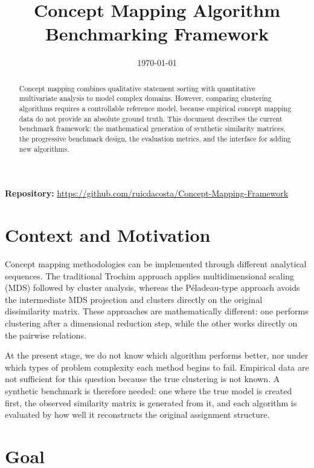 \documentclass[11pt,a4paper]{article}
\title{\textbf{Concept Mapping Algorithm Benchmarking Framework}}
\author{}
\date{\today}
\begin{document}
\maketitle

\begin{abstract}
Concept mapping combines qualitative statement sorting with quantitative multivariate analysis to model complex domains. However, comparing clustering algorithms requires a controllable reference model, because empirical concept mapping data do not provide an absolute ground truth. This document describes the current benchmark framework: the mathematical generation of synthetic similarity matrices, the progressive benchmark design, the evaluation metrics, and the interface for adding new algorithms.
\end{abstract}

\noindent\textbf{Repository:} \url{https://github.com/ruicdacosta/Concept-Mapping-Framework}

\vspace{0.5em}

\tableofcontents
\newpage

\section{Context and Motivation}

Concept mapping methodologies can be implemented through different analytical sequences. The traditional Trochim approach applies multidimensional scaling (MDS) followed by cluster analysis, whereas the P\'eladeau-type approach avoids the intermediate MDS projection and clusters directly on the original dissimilarity matrix. These approaches are mathematically different: one performs clustering after a dimensional reduction step, while the other works directly on the pairwise relations.

At the present stage, we do not know which algorithm performs better, nor under which types of problem complexity each method begins to fail. Empirical data are not sufficient for this question because the true clustering is not known. A synthetic benchmark is therefore needed: one where the true model is created first, the observed similarity matrix is generated from it, and each algorithm is evaluated by how well it reconstructs the original assignment structure.

\section{Goal}
\end{document}
